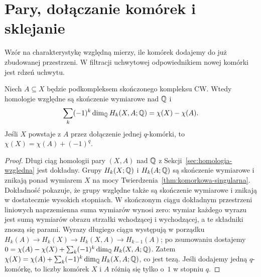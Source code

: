 \section{Pary, dołączanie komórek i sklejanie}
\label{sec:app-euler-sklejanie}

Wzór na charakterystykę względną mierzy, ile komórek dodajemy do
już zbudowanej przestrzeni. W filtracji uchwytowej odpowiednikiem
nowej komórki jest rdzeń uchwytu.

\begin{stwierdzenie}
\label{prop:app-euler-wzgledna}
Niech $A\subseteq X$ będzie podkompleksem skończonego kompleksu CW.
Wtedy homologie względne są skończenie wymiarowe nad $\mathbb{Q}$ i
\begin{equation}\label{eq:app-euler-wzgledna}
 \sum_k(-1)^k\dim_{\mathbb{Q}}H_k(X,A;\mathbb{Q})
 =\chi(X)-\chi(A).
\end{equation}
Jeśli $X$ powstaje z $A$ przez dołączenie jednej $q$-komórki,
to $\chi(X)=\chi(A)+(-1)^q$.
\end{stwierdzenie}
\begin{proof}
Długi ciąg homologii pary $(X,A)$ nad $\mathbb{Q}$ z
Sekcji~\ref{sec:homologia-wzgledna} jest dokładny.
Grupy $H_k(X;\mathbb{Q})$ i $H_k(A;\mathbb{Q})$ są skończenie wymiarowe i znikają
ponad wymiarem $X$ na mocy Twierdzenia~\ref{thm:komorkowa-singularna}.
Dokładność pokazuje, że grupy względne także są skończenie
wymiarowe i znikają w dostatecznie wysokich stopniach.
W skończonym ciągu dokładnym przestrzeni liniowych naprzemienna suma
wymiarów wynosi zero: wymiar każdego wyrazu jest sumą wymiarów
obrazu strzałki wchodzącej i wychodzącej, a te składniki znoszą się
parami. Wyrazy długiego ciągu występują w porządku
$H_k(A)\to H_k(X)\to H_k(X,A)\to H_{k-1}(A)$;
po zsumowaniu dostajemy
$0=\chi(A)-\chi(X)+\sum_k(-1)^k\dim_{\mathbb{Q}}H_k(X,A;\mathbb{Q})$.
Zatem
$\chi(X)=\chi(A)+\sum_k(-1)^k\dim_{\mathbb{Q}}H_k(X,A;\mathbb{Q})$,
co jest tezą. Jeśli dodajemy jedną $q$-komórkę, to liczby komórek
$X$ i $A$ różnią się tylko o~$1$ w stopniu $q$.
\end{proof}

